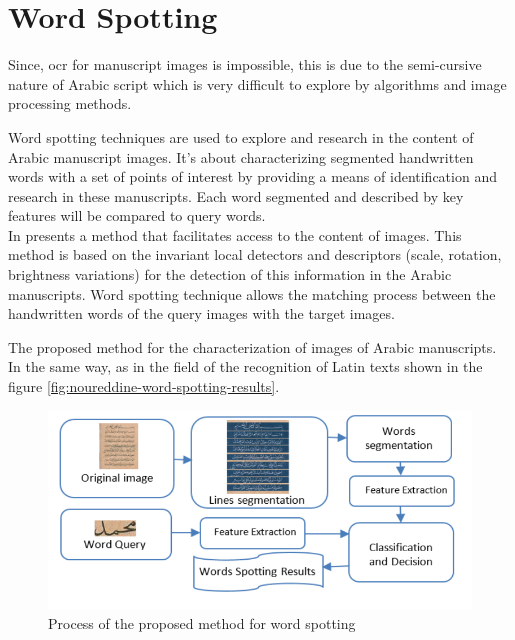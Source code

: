 \section{Word Spotting}
Since, \acrshort{ocr} for manuscript images is impossible, this is due to the semi-cursive nature of Arabic script which is very difficult to explore by algorithms and image processing methods.

\noindent
Word spotting techniques are used to explore and research in the content of Arabic manuscript images. It’s about characterizing segmented handwritten words with a set of points of interest by providing a means of identification and research in these manuscripts. Each word segmented and described by key features will be compared to query words. \\

In \cite{Noureddine} presents a method that facilitates access to the content of images. This method is based on the invariant local detectors and descriptors (scale, rotation, brightness variations) for the detection of this information in the Arabic manuscripts. Word spotting technique allows the matching process between the handwritten words of the query images with the target images. 

The proposed method for the characterization of images of Arabic manuscripts. In the same way, as in the field of the recognition of Latin texts shown in the figure \ref{fig:noureddine-word-spotting-results}.
\begin{figure}[!htb]
    \centering
    \includegraphics[width=13cm]{images/noureddine-word-spotting.png}
    \caption{Process of the proposed method for word spotting}
    \label{fig:noureddine-word-spotting}
\end{figure}

